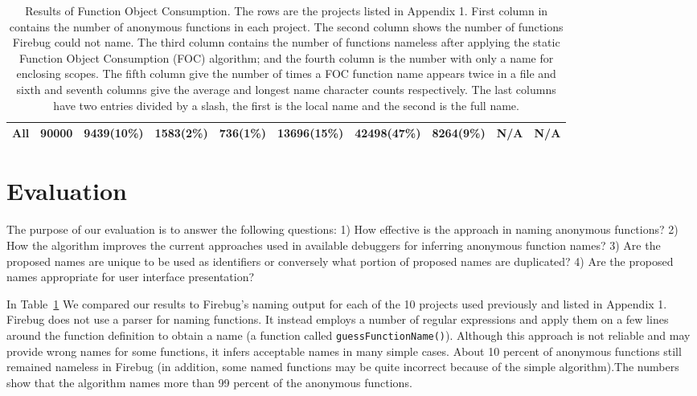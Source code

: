 \documentclass[10pt, preprint]{sigplanconf}
\begin{document}
\begin{table}
{\begin{tabular}{ | l | l | l | l | l | l | l | l | l | l |}
  \hline 
   All           & 90000     &   9439(10\%)   & 1583(2\%) & 736(1\%)  &    13696(15\%)       &    42498(47\%)        & 8264(9\%)   & N/A            & N/A         \\ 
  \hline       
  \end{tabular}
  }
 \label{evaluation} 
\caption{Results of Function Object Consumption. The rows are the projects listed in Appendix 1. First column in  contains the number of anonymous functions in each project. The second column shows the number of functions Firebug could not name. The third column contains the number of functions nameless after applying the static Function Object Consumption (FOC) algorithm;  and the fourth column is the number with only a name for enclosing scopes. The fifth column give the number of times a FOC function name appears twice in a file and sixth and seventh columns give the average and longest name character counts respectively. The last columns have two entries divided by a slash, the first is the local name and the second is the full name.} 
\end{table}    

\section{Evaluation}
The purpose of our evaluation is to answer the following questions: 1) How effective is the approach in naming anonymous functions? 2) How the algorithm  improves the current approaches used in available debuggers for inferring anonymous function names? 3) Are the proposed names are unique to be used as identifiers or conversely what portion of proposed names are duplicated? 4) Are the proposed names appropriate for user interface presentation? 

In Table~\ref{evaluation} We compared our results to Firebug's naming output for each of the 10 projects used previously and listed in Appendix 1. Firebug does not use a parser for naming functions. It instead employs a number of regular expressions and apply them on a few lines around the function definition to obtain a name  (a function called {\small \texttt{guessFunctionName()}}). Although this approach is not reliable and may provide wrong names for some functions, it infers acceptable names in many simple cases. About 10 percent of anonymous functions still remained nameless in Firebug (in addition, some named functions may be quite incorrect because of the simple algorithm).The numbers show that the algorithm names more than 99 percent of the anonymous functions.
\end{document}
